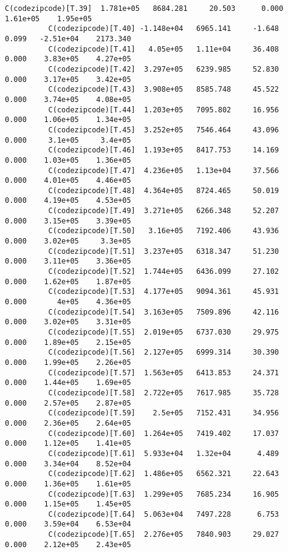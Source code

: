 \documentclass[11pt]{article}
\begin{document}
\begin{Verbatim}[commandchars=\\\{\}]
          C(codezipcode)[T.39]  1.781e+05   8684.281     20.503      0.000    1.61e+05    1.95e+05
          C(codezipcode)[T.40] -1.148e+04   6965.141     -1.648      0.099   -2.51e+04    2173.340
          C(codezipcode)[T.41]   4.05e+05   1.11e+04     36.408      0.000    3.83e+05    4.27e+05
          C(codezipcode)[T.42]  3.297e+05   6239.985     52.830      0.000    3.17e+05    3.42e+05
          C(codezipcode)[T.43]  3.908e+05   8585.748     45.522      0.000    3.74e+05    4.08e+05
          C(codezipcode)[T.44]  1.203e+05   7095.802     16.956      0.000    1.06e+05    1.34e+05
          C(codezipcode)[T.45]  3.252e+05   7546.464     43.096      0.000     3.1e+05     3.4e+05
          C(codezipcode)[T.46]  1.193e+05   8417.753     14.169      0.000    1.03e+05    1.36e+05
          C(codezipcode)[T.47]  4.236e+05   1.13e+04     37.566      0.000    4.01e+05    4.46e+05
          C(codezipcode)[T.48]  4.364e+05   8724.465     50.019      0.000    4.19e+05    4.53e+05
          C(codezipcode)[T.49]  3.271e+05   6266.348     52.207      0.000    3.15e+05    3.39e+05
          C(codezipcode)[T.50]   3.16e+05   7192.406     43.936      0.000    3.02e+05     3.3e+05
          C(codezipcode)[T.51]  3.237e+05   6318.347     51.230      0.000    3.11e+05    3.36e+05
          C(codezipcode)[T.52]  1.744e+05   6436.099     27.102      0.000    1.62e+05    1.87e+05
          C(codezipcode)[T.53]  4.177e+05   9094.361     45.931      0.000       4e+05    4.36e+05
          C(codezipcode)[T.54]  3.163e+05   7509.896     42.116      0.000    3.02e+05    3.31e+05
          C(codezipcode)[T.55]  2.019e+05   6737.030     29.975      0.000    1.89e+05    2.15e+05
          C(codezipcode)[T.56]  2.127e+05   6999.314     30.390      0.000    1.99e+05    2.26e+05
          C(codezipcode)[T.57]  1.563e+05   6413.853     24.371      0.000    1.44e+05    1.69e+05
          C(codezipcode)[T.58]  2.722e+05   7617.985     35.728      0.000    2.57e+05    2.87e+05
          C(codezipcode)[T.59]    2.5e+05   7152.431     34.956      0.000    2.36e+05    2.64e+05
          C(codezipcode)[T.60]  1.264e+05   7419.402     17.037      0.000    1.12e+05    1.41e+05
          C(codezipcode)[T.61]  5.933e+04   1.32e+04      4.489      0.000    3.34e+04    8.52e+04
          C(codezipcode)[T.62]  1.486e+05   6562.321     22.643      0.000    1.36e+05    1.61e+05
          C(codezipcode)[T.63]  1.299e+05   7685.234     16.905      0.000    1.15e+05    1.45e+05
          C(codezipcode)[T.64]  5.063e+04   7497.228      6.753      0.000    3.59e+04    6.53e+04
          C(codezipcode)[T.65]  2.276e+05   7840.903     29.027      0.000    2.12e+05    2.43e+05

\end{Verbatim}
\end{document}
